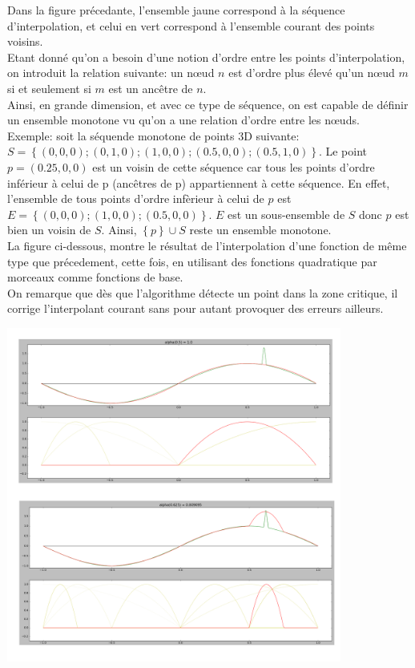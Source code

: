 Dans la figure précedante, l'ensemble jaune correspond à la séquence d'interpolation, et celui en vert correspond à l'ensemble courant des points voisins.\\
Etant donné qu'on a besoin d'une notion d'ordre entre les points d'interpolation, on introduit la relation suivante: un nœud $n$ est d'ordre plus élevé qu'un nœud $m$ si et seulement si $m$ est un ancêtre de $n$.\\
Ainsi, en grande dimension, et avec ce type de séquence, on est capable de définir un ensemble monotone vu qu'on a une relation d'ordre entre les nœuds.\\
Exemple: soit la séquende monotone de points 3D suivante:\\
 $S = \left \{ (0,0,0); (0,1,0); (1,0,0); (0.5,0,0); (0.5,1,0) \right \}$. Le point $p = (0.25,0,0)$ est un voisin de cette séquence car tous les points d'ordre inférieur à celui
de p (ancêtres de p) appartiennent à cette séquence. En effet, l'ensemble de tous points d'ordre infèrieur à celui de $p$ est $E = \left \{(0,0,0); (1,0,0); (0.5,0,0)\right \}$. $E$ est un sous-ensemble de $S$ donc $p$ est bien un voisin de $S$.
Ainsi, $\left \{p \right \} \cup S$ reste un ensemble monotone.\\
La figure ci-dessous, montre le résultat de l'interpolation d'une fonction de même type que précedement, cette fois, en utilisant des fonctions quadratique par morceaux comme fonctions de base.\\
On remarque que dès que l'algorithme détecte un point dans la zone critique, il corrige l'interpolant courant sans pour autant provoquer des erreurs ailleurs.\\
\begin{center}
\includegraphics[height= 11cm,width = 11cm]{images/interp_pm.png}
\end{center}

